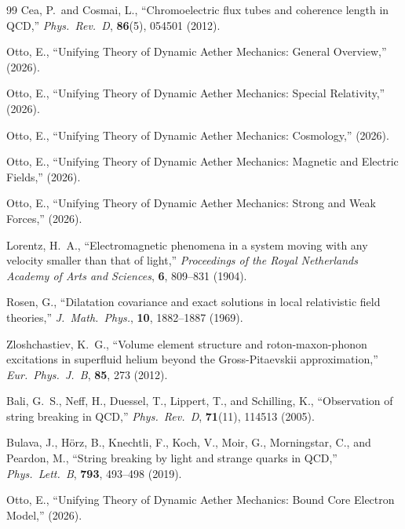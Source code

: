 ﻿\documentclass[12pt,letterpaper]{article}
\begin{document}
\begin{thebibliography}{99}
Cea, P.\ and Cosmai, L.,
``Chromoelectric flux tubes and coherence length in QCD,''
\textit{Phys.\ Rev.\ D}, \textbf{86}(5), 054501 (2012).




Otto, E.,
``Unifying Theory of Dynamic Aether Mechanics: General Overview,''
(2026).

Otto, E.,
``Unifying Theory of Dynamic Aether Mechanics: Special Relativity,''
(2026).

Otto, E.,
``Unifying Theory of Dynamic Aether Mechanics: Cosmology,''
(2026).

Otto, E.,
``Unifying Theory of Dynamic Aether Mechanics: Magnetic and Electric Fields,''
(2026).

Otto, E.,
``Unifying Theory of Dynamic Aether Mechanics: Strong and Weak Forces,''
(2026).

Lorentz, H.~A.,
``Electromagnetic phenomena in a system moving with any velocity smaller than that of light,''
\textit{Proceedings of the Royal Netherlands Academy of Arts and Sciences}, \textbf{6}, 809--831 (1904).

Rosen, G.,
``Dilatation covariance and exact solutions in local relativistic field theories,''
\textit{J.\ Math.\ Phys.}, \textbf{10}, 1882--1887 (1969).

Zloshchastiev, K.~G.,
``Volume element structure and roton-maxon-phonon excitations in superfluid helium beyond the Gross-Pitaevskii approximation,''
\textit{Eur.\ Phys.\ J.\ B}, \textbf{85}, 273 (2012).

Bali, G.~S., Neff, H., Duessel, T., Lippert, T., and Schilling, K.,
``Observation of string breaking in QCD,''
\textit{Phys.\ Rev.\ D}, \textbf{71}(11), 114513 (2005).

Bulava, J., H\"orz, B., Knechtli, F., Koch, V., Moir, G., Morningstar, C., and Peardon, M.,
``String breaking by light and strange quarks in QCD,''
\textit{Phys.\ Lett.\ B}, \textbf{793}, 493--498 (2019).

Otto, E.,
``Unifying Theory of Dynamic Aether Mechanics: Bound Core Electron Model,''
(2026).
\end{thebibliography}
\end{document}
